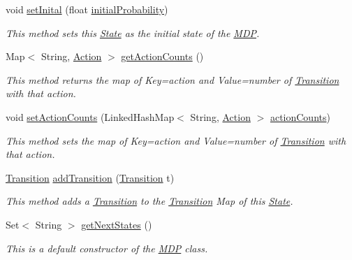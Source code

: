 \begin{DoxyCompactItemize}
void \hyperlink{classmdp_1_1core_1_1_state_ae2b8a26846dfde87eac8dc536b171355}{set\+Inital} (float \hyperlink{classmdp_1_1core_1_1_state_a237d2d5f81db0553a2180cf66a20472b}{initial\+Probability})
\begin{DoxyCompactList}\small\item\em This method sets this \hyperlink{classmdp_1_1core_1_1_state}{State} as the initial state of the \hyperlink{classmdp_1_1core_1_1_m_d_p}{M\+D\+P}. \end{DoxyCompactList}\item 
Map$<$ String, \hyperlink{classmdp_1_1core_1_1_action}{Action} $>$ \hyperlink{classmdp_1_1core_1_1_state_ac4ee428e57bd594d203de402e196cbba}{get\+Action\+Counts} ()
\begin{DoxyCompactList}\small\item\em This method returns the map of Key=action and Value=number of \hyperlink{classmdp_1_1core_1_1_transition}{Transition} with that action. \end{DoxyCompactList}\item 
void \hyperlink{classmdp_1_1core_1_1_state_a38fcd3a67282bf66c86456ed88b065cf}{set\+Action\+Counts} (Linked\+Hash\+Map$<$ String, \hyperlink{classmdp_1_1core_1_1_action}{Action} $>$ \hyperlink{classmdp_1_1core_1_1_state_a8c44f739b3fe71dd166fc6ab59087d4f}{action\+Counts})
\begin{DoxyCompactList}\small\item\em This method sets the map of Key=action and Value=number of \hyperlink{classmdp_1_1core_1_1_transition}{Transition} with that action. \end{DoxyCompactList}\item 
\hyperlink{classmdp_1_1core_1_1_transition}{Transition} \hyperlink{classmdp_1_1core_1_1_state_acc75ae62e5e0fe543bf49b616f88359c}{add\+Transition} (\hyperlink{classmdp_1_1core_1_1_transition}{Transition} t)
\begin{DoxyCompactList}\small\item\em This method adds a \hyperlink{classmdp_1_1core_1_1_transition}{Transition} to the \hyperlink{classmdp_1_1core_1_1_transition}{Transition} Map of this \hyperlink{classmdp_1_1core_1_1_state}{State}. \end{DoxyCompactList}\item 
Set$<$ String $>$ \hyperlink{classmdp_1_1core_1_1_state_afa42873a5a6554333a18a052ec52f59e}{get\+Next\+States} ()
\begin{DoxyCompactList}\small\item\em This is a default constructor of the \hyperlink{classmdp_1_1core_1_1_m_d_p}{M\+D\+P} class. \end{DoxyCompactList}\item 

\end{DoxyCompactItemize}
